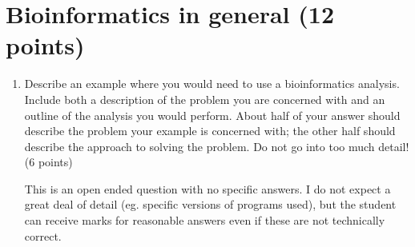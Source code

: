 \documentclass[11pt]{article}
\begin{document}
\section{Bioinformatics in general (12 points)}
\begin{enumerate}
\item Describe an example where you would need to use a bioinformatics
  analysis. Include both a description of the problem you are concerned with
  and an outline of the analysis you would perform. About half of your answer
  should describe the problem your example is concerned with; the other half
  should describe the approach to solving the problem. Do not go into too much
  detail!\\
  (6 points)\\
\begin{Notes}
  This is an open ended question with no specific answers. I do not expect a
  great deal of detail (eg. specific versions of programs used), but the
  student can receive marks for reasonable answers even if these are not
  technically correct.
\end{Notes}


\end{enumerate}
\end{document}

